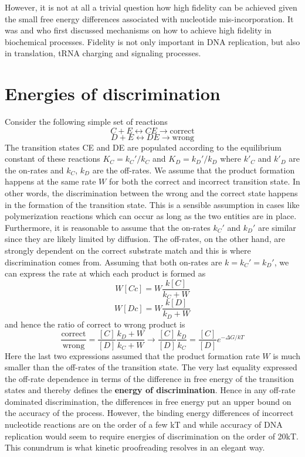 However, it is not at all a trivial question how high fidelity can be achieved given the small free energy differences associated with nucleotide mis-incorporation.
It was \citep{hopfield_kinetic_1974} and \citep{ninio_kinetic_1975} who first discussed mechanisms on how to achieve high fidelity in biochemical processes.
Fidelity is not only important in DNA replication, but also in translation, tRNA charging and signaling processes.

\section{Energies of discrimination}
Consider the following simple set of reactions
\begin{equation}
C + E \leftrightarrow CE \rightarrow \mathrm{correct}
\end{equation}
\begin{equation}
D + E \leftrightarrow DE \rightarrow \mathrm{wrong}
\end{equation}
The transition states CE and DE are populated according to the equilibrium constant of these reactions $K_C =k_C'/k_C$ and $K_D = k_D'/k_D$ where $k'_C$  and $k'_D$ are the on-rates and $k_C$, $k_D$ are the off-rates.
We assume that the product formation happens at the same rate $W$ for both the correct and incorrect transition state.
In other words, the discrimination between the wrong and the correct state happens in the formation of the transition state.
This is a sensible assumption in cases like polymerization reactions which can occur as long as the two entities are in place.
Furthermore, it is reasonable to assume that the on-rates $k_C'$ and $k_D'$ are similar since they are likely limited by diffusion.
The off-rates, on the other hand, are strongly dependent on the correct substrate match and this is where discrimination comes from.
Assuming that both on-rates are $k = k_C' = k_D'$, we can express the rate at which each product is formed as
\begin{equation}
W[Cc] = W\frac{k[C]}{k_C+W}
\end{equation}
\begin{equation}
W[Dc] = W\frac{k[D]}{k_D+W}
\end{equation}
and hence the ratio of correct to wrong product is
\begin{equation}
\frac{\mathrm{correct}}{\mathrm{wrong}} = \frac{[C]}{[D]}\frac{k_D+W}{k_C + W} \rightarrow \frac{[C]}{[D]}\frac{k_D}{k_C} =  \frac{[C]}{[D]}e^{-\Delta G/kT}
\end{equation}
Here the last two expressions assumed that the product formation rate $W$ is much smaller than the off-rates of the transition state.
The very last equality expressed the off-rate dependence in terms of the difference in free energy of the transition states and thereby defines the {\bf energy of discrimination}.
Hence in any off-rate dominated discrimination, the differences in free energy put an upper bound on the accuracy of the process.
However, the binding energy differences of incorrect nucleotide reactions are on the order of a few kT and while accuracy of DNA replication would seem to require energies of discrimination on the order of 20kT.
This conundrum is what kinetic proofreading resolves in an elegant way.

